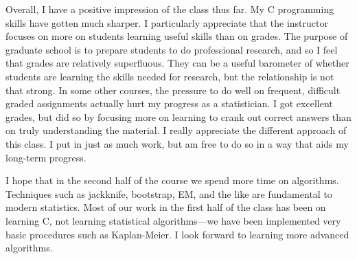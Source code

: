 \documentclass{report}
\begin{document}
Overall, I have a positive impression of the class thus far. My C programming
skills have gotten much sharper. I particularly appreciate that the instructor
focuses on more on students learning useful skills than on grades. The purpose of
graduate school is to prepare students to do professional research, and so 
I feel that grades are relatively superfluous. They can be a useful
barometer of whether students are learning the skills needed for research, but the
relationship is not that strong. In some other courses, the pressure 
to do well on frequent, difficult graded assignments actually hurt my
progress as a statistician. I got excellent grades, but did so by focusing more on 
learning to crank out correct answers than on truly understanding the material.
I really appreciate the different approach of this class. I put in just as much 
work, but am free to do so in a way that aids my long-term progress. 

I hope that in the second half of the course we spend more time on algorithms.
Techniques such as jackknife, bootstrap, EM, and the like are fundamental to
modern statistics. Most of our work in the first half of the class has been on
learning C, not learning statistical algorithms---we have been implemented very
basic procedures such as Kaplan-Meier. I look forward to learning more advanced
algorithms.
\end{document}
